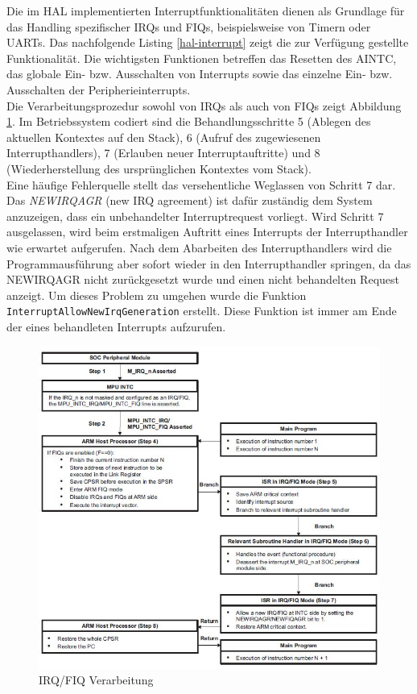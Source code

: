 Die im \ac{HAL} implementierten Interruptfunktionalitäten dienen als Grundlage für das Handling spezifischer IRQs und FIQs, beispielsweise von Timern oder \ac{UART}s. Das nachfolgende Listing \ref{hal-interrupt} zeigt die zur Verfügung gestellte Funktionalität. Die wichtigsten Funktionen betreffen das Resetten des \ac{AINTC}, das globale Ein- bzw. Ausschalten von Interrupts sowie das einzelne Ein- bzw. Ausschalten der Peripherieinterrupts.\\



Die Verarbeitungsprozedur sowohl von IRQs als auch von FIQs zeigt Abbildung \ref{fig:interruptProcedure}. Im Betriebssystem codiert sind die Behandlungsschritte 5 (Ablegen des aktuellen Kontextes auf den Stack), 6 (Aufruf des zugewiesenen Interrupthandlers), 7 (Erlauben neuer Interruptauftritte) und 8 (Wiederherstellung des ursprünglichen Kontextes vom Stack).\\

Eine häufige Fehlerquelle stellt das versehentliche Weglassen von Schritt 7 dar. Das \textit{NEWIRQAGR} (new IRQ agreement) ist dafür zuständig dem System anzuzeigen, dass ein unbehandelter Interruptrequest vorliegt. Wird Schritt 7 ausgelassen, wird beim erstmaligen Auftritt eines Interrupts der Interrupthandler wie erwartet aufgerufen. Nach dem Abarbeiten des Interrupthandlers wird die Programmausführung aber sofort wieder in den Interrupthandler springen, da das NEWIRQAGR nicht zurückgesetzt wurde und einen nicht behandelten Request anzeigt. Um dieses Problem zu umgehen wurde die Funktion
\texttt{InterruptAllowNew\-IrqGeneration} erstellt. Diese Funktion ist immer am Ende der eines behandleten Interrupts aufzurufen.

\begin{figure}[H]
	\includegraphics[scale=1]{chapters/hal/figures/interruptProcedure}
	\caption{IRQ/FIQ Verarbeitung \cite[S. 193]{ARM:TRM}}
	\label{fig:interruptProcedure}
\end{figure}


